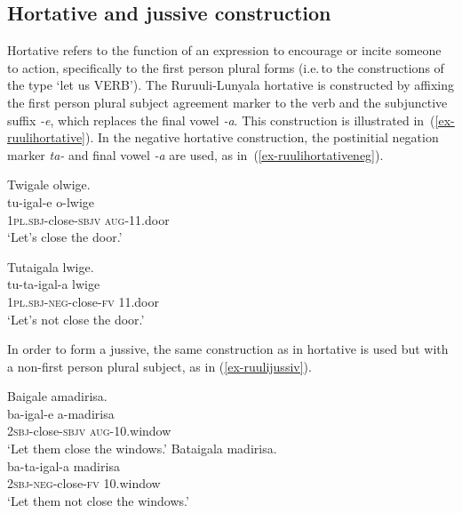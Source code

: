 \subsection{Hortative and jussive construction}\label{sec-hortative}
Hortative refers to the function of an expression to encourage or incite someone to action, specifically to the first person plural forms (i.e.\,to the constructions of the type ‘let us VERB').
The Ru\-ruu\-li\hyp{}Lu\-nya\-la hortative is constructed by affixing the first person plural subject agreement marker to the verb and the subjunctive suffix \emph{-e}, which replaces the final vowel \emph{-a}. 
This construction is illustrated in~(\ref{ex-ruulihortative}). 
In the negative hortative construction, the postinitial negation marker \emph{ta-} and final vowel \emph{-a} are used, as in~(\ref{ex-ruulihortativeneg}). 

\ea \label{ex-ruulimoods}
\begin{xlist}
\ex \label{ex-ruulihortative}
	\glll  Twigale olwige.\\
		tu-igal-e o-lwige\\
		1\textsc{pl.sbj}-close-\textsc{sbjv} \textsc{aug}-11.door\\
	\glt ‘Let's close the door.’ 
	
\ex \label{ex-ruulihortativeneg}
	\glll	Tutaigala lwige.\\
		  tu-ta-igal-a lwige\\
		1\textsc{pl.sbj}-\textsc{neg}-close-\textsc{fv} 11.door\\
	\glt ‘Let's not close the door.’ 
\end{xlist}
\z

In order to form a jussive, the same construction as in hortative is used but with a non-first person plural subject, as in  (\ref{ex-ruulijussiv}). 

\ea \label{ex-ruulijussiv}
\begin{xlist}
\ex \label{ex-ruulijussivepos}
	\glll Baigale amadirisa.\\
		 ba-igal-e a-madirisa\\
		\textsc{2sbj}-close-\textsc{sbjv} \textsc{aug}-10.window\\
	\glt ‘Let them close the windows.’ 
\ex \label{ex-ruulijussiveneg}
	\glll	Bataigala madirisa.\\
		  ba-ta-igal-a madirisa\\
		\textsc{2sbj}-\textsc{neg}-close-\textsc{fv} 10.window\\
	\glt ‘Let them not close the windows.’
\end{xlist}
\z


